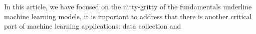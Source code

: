 In this article, we have focused on the nitty-gritty of the fundamentals underline machine learning models, it is important to address that there is another critical part of machine learning applications: data collection and 